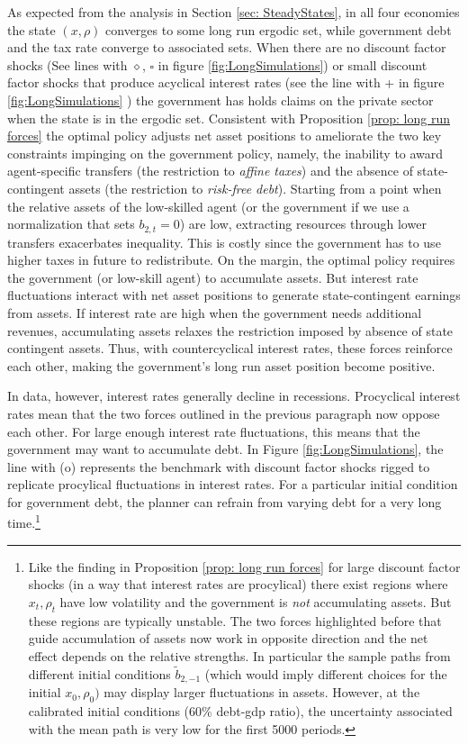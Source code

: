 \documentclass[thmsb,11pt]{article}
\begin{document}
As expected from the analysis in  Section \ref{sec: SteadyStates}, in all four economies the state $(x,\rho)$   converges to some long run
ergodic set, while government debt and the tax rate converge to associated sets. When there are no discount factor shocks
(See lines with {$\diamond$, \scriptsize  $\square$ \normalsize}in figure \ref{fig:LongSimulations}) or small discount factor shocks that produce acyclical interest rates (see the line with + in figure \ref{fig:LongSimulations} )
the government has holds claims on the private sector when the state is  in the ergodic set. Consistent with Proposition \ref{prop: long run forces} %
 the optimal policy adjusts  net asset
positions to ameliorate the two key constraints impinging  on the government policy, namely,
the inability to award agent-specific transfers (the restriction to \emph{affine taxes}) and the  absence of state-contingent assets (the
restriction to \emph {risk-free debt}). Starting from a point when the
relative assets of the low-skilled agent (or the government if we use a
 normalization that sets $b_{2,t} = 0$) are low, extracting resources through lower
transfers exacerbates inequality. This is costly since the government has to
use higher taxes in future to redistribute. On the margin, the optimal policy requires the government (or low-skill agent) to accumulate assets. But  interest rate
fluctuations interact with net asset positions to generate state-contingent  earnings
from assets. If interest rate are high when the government needs additional
revenues, accumulating assets relaxes the restriction imposed by absence
of state contingent assets. Thus, with countercyclical interest rates, these
forces reinforce each other, making the government's  long run asset position become positive.

In data, however, interest rates  generally decline in recessions. Procyclical interest rates mean that the
two forces outlined in the previous paragraph now oppose each other.  For  large enough interest rate fluctuations, this means that
the
government may want to accumulate debt. In Figure \ref{fig:LongSimulations}, the
line with (o) represents the benchmark with discount factor shocks rigged to
replicate  procylical fluctuations in interest rates. For a particular initial condition for government debt,
the planner can refrain from varying debt for a very  long time.\footnote{Like the finding in Proposition \ref{prop: long run forces} for large discount factor shocks (in a way that interest rates are procylical)  there exist
regions where $x_t,\rho_t$ have low volatility and the  government is \emph{not} accumulating assets. But these
regions  are typically unstable. The two forces highlighted before that guide accumulation of assets now work in opposite direction and the net effect depends
on the relative strengths. In particular the sample paths from different initial conditions $\tilde{b}_{2,-1}$ (which would imply different choices for the initial $x_0,\rho_0)$ may display larger fluctuations in assets. However, at the calibrated initial conditions ($60\%$ debt-gdp ratio), the uncertainty associated with the mean path is very low for the first 5000 periods.}
\end{document}
